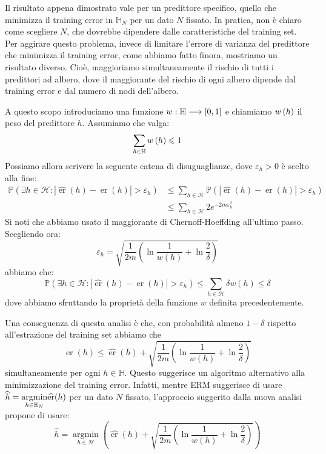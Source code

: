 \documentclass[\main/main.tex]{subfiles}
\begin{document}
\begin{observation}[Generalizzazione]
    Il risultato appena dimostrato vale per un predittore specifico, quello che minimizza il training error in \(\mathbb{H}_N\) per un dato \(N\) fissato. In pratica, non è chiaro come scegliere \(N\), che dovrebbe dipendere dalle caratteristiche del training set. Per aggirare questo problema, invece di limitare l'errore di varianza del predittore che minimizza il training error, come abbiamo fatto finora, mostriamo un risultato diverso. Cioè, maggioriamo simultaneamente il rischio di tutti i predittori ad albero, dove il maggiorante del rischio di ogni albero dipende dal training error e dal numero di nodi dell'albero.
    \begin{multicols}{2}
    A questo scopo introduciamo una funzione \(w:\mathbb{H}\longrightarrow \left[0,1\right]\) e chiamiamo \(w\left(h\right)\) il peso del predittore \(h\). Assumiamo che valga:
    \[
        \sum_{h \in \mathbb{H}} w\left(h\right) \leqslant 1
    \]
    Possiamo allora scrivere la seguente catena di disuguaglianze, dove \(\varepsilon_h > 0\) è scelto alla fine:
    \begin{align*}
    \mathbb{P}\left(\exists h \in \mathcal{H} :|\widehat{\operatorname{er}}(h)-\operatorname{er}(h)|>\varepsilon_{h}\right) &\leq \sum_{h \in \mathcal{H}} \mathbb{P}\left(|\widehat{\operatorname{er}}(h)-\operatorname{er}(h)|>\varepsilon_{h}\right)\\ &\leq \sum_{h \in \mathcal{H}} 2 e^{-2 m \varepsilon_{h}^{2}}    
    \end{align*}
    Si noti che abbiamo usato il maggiorante di Chernoff-Hoeffding all’ultimo passo. Scegliendo ora:
    \[
        \varepsilon_{h}=\sqrt{\frac{1}{2 m}\left(\ln \frac{1}{w(h)}+\ln \frac{2}{\delta}\right)}
    \]
    abbiamo che:
    \[
        \mathbb{P}\left(\exists h \in \mathcal{H} :|\widehat{\operatorname{er}}(h)-\operatorname{er}(h)|>\varepsilon_{h}\right) \leq \sum_{h \in \mathcal{H}} \delta w(h) \leq \delta
    \]
    dove abbiamo sfruttando la proprietà della funzione \(w\) definita precedentemente.
    
    Una conseguenza di questa analisi è che, con probabilità almeno \(1-\delta\) rispetto all'estrazione del training set abbiamo che
    \[
        \operatorname{er}(h) \leq \widehat{\operatorname{er}}(h)+\sqrt{\frac{1}{2 m}\left(\ln \frac{1}{w(h)}+\ln \frac{2}{\delta}\right)}
    \]
    simultaneamente per ogni \(h \in \mathbb{H}\). Questo suggerisce un algoritmo alternativo alla minimizzazione del training error. Infatti, mentre ERM suggerisce di usare \(\widehat{h}=\underset{h \in \mathbb{H}_{N}}{\operatorname*{argmin}} \widehat{\operatorname{er}}(h)\) per un dato \(N\) fissato, l'approccio suggerito dalla nuova analisi propone di usare:
    \[
        \widehat{h}=\underset{h \in \mathcal{H}}{\operatorname{argmin}}\left(\widehat{\operatorname{er}}(h)+\sqrt{\frac{1}{2 m}\left(\ln \frac{1}{w(h)}+\ln \frac{2}{\delta}\right)}\right)
    \]
    \end{multicols}
\end{observation}
\end{document}
